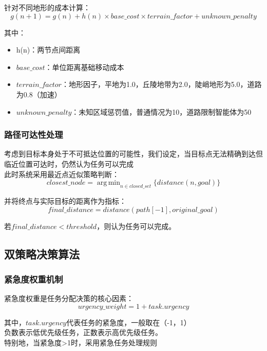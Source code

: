 \documentclass[12pt,a4paper]{article}
\DeclareMathOperator*{\argmin}{arg\,min}
\begin{document}
针对不同地形的成本计算：
\begin{equation}
g(n+1) = g(n) + h(n) \times base\_cost \times terrain\_factor + unknown\_penalty
\end{equation}

其中：
\begin{itemize}
\item h(n)：两节点间距离
\item $base\_cost$：单位距离基础移动成本
\item $terrain\_factor$：地形因子，平地为1.0，丘陵地带为2.0，陡峭地形为5.0，道路为0.8（加速）
\item $unknown\_penalty$：未知区域惩罚值，普通情况为10，道路限制智能体为50
\end{itemize}

\subsubsection{路径可达性处理}
考虑到目标本身处于不可抵达位置的可能性，我们设定，当目标点无法精确到达但临近位置可达时，仍然认为任务可以完成\\
此时系统采用最近点近似策略判断：
\begin{equation}
closest\_node = \argmin_{n \in closed\_set} \{distance(n, goal)\}
\end{equation}

并将终点与实际目标的距离作为指标：
\begin{equation}
final\_distance = distance(path[-1], original\_goal)
\end{equation}

若$final\_distance < threshold$，则认为任务可以完成。

\subsection{双策略决策算法}

\subsubsection{紧急度权重机制}
紧急度权重是任务分配决策的核心因素：
\begin{equation}
urgency\_weight = 1 + task.urgency
\end{equation}

其中，$task.urgency$代表任务的紧急度，一般取在（-1，1）\\
负数表示低优先级任务，正数表示高优先级任务。\\
特别地，当紧急度>1时，采用紧急任务处理规则
\end{document}
